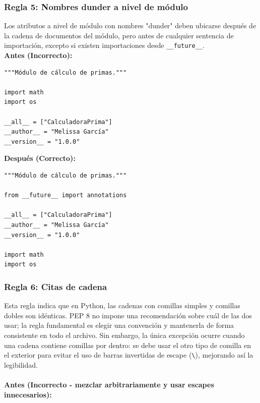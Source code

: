 \documentclass{article}
\begin{document}
    	\subsubsection*{Regla 5: Nombres dunder a nivel de módulo}
    	Los atributos a nivel de módulo con nombres "dunder" deben ubicarse después de la cadena de documentos del módulo, pero antes
		 de cualquier sentencia de importación, excepto si existen importaciones desde \texttt{\_\_future\_\_}. \\
    
    	\textbf{Antes (Incorrecto):}
    	\begin{verbatim}
"""Módulo de cálculo de primas."""

import math
import os

__all__ = ["CalculadoraPrima"]
__author__ = "Melissa García"
__version__ = "1.0.0"
    	\end{verbatim}
    
    	\textbf{Después (Correcto):}
    	\begin{verbatim}
"""Módulo de cálculo de primas."""

from __future__ import annotations

__all__ = ["CalculadoraPrima"]
__author__ = "Melissa García"
__version__ = "1.0.0"

import math
import os
    	\end{verbatim}
		
	    \subsubsection*{Regla 6: Citas de cadena}
    	    Esta regla indica que en Python, las cadenas con comillas simples y comillas dobles son idénticas.
			PEP 8 no impone una recomendación sobre cuál de las dos usar; la regla fundamental es elegir una convención
			y mantenerla de forma consistente en todo el archivo. Sin embargo, la única excepción ocurre cuando una cadena 
			contiene comillas por dentro: se debe usar el otro tipo de comilla en el exterior para evitar el uso de barras
			invertidas de escape (\texttt{\textbackslash}), mejorando así la legibilidad.\\ \\
    
	        \textbf{Antes (Incorrecto - mezclar arbitrariamente y usar escapes innecesarios):}
\end{document}
